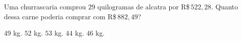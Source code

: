 Uma churrascaria comprou $29$ quilogramas de alcatra por R\$\,$522{,}28$. Quanto dessa carne poderia comprar com R\$\,$882{,}49$?

$49$ kg.
$52$ kg.
$53$ kg.
$44$ kg.
$46$ kg.



